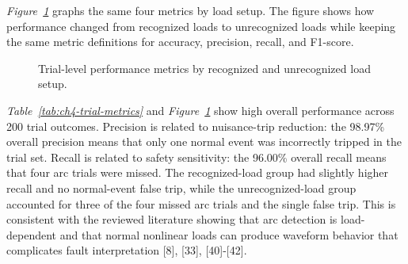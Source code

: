 \textit{Figure~\ref{fig:ch4-group-metrics}} graphs the same four metrics by
load setup. The figure shows how performance changed from recognized loads to
unrecognized loads while keeping the same metric definitions for accuracy,
precision, recall, and F1-score.

\begin{figure}[H]
  \centering
  \caption{Trial-level performance metrics by recognized and unrecognized load setup.}
  \label{fig:ch4-group-metrics}
\end{figure}

\textit{Table~\ref{tab:ch4-trial-metrics}} and
\textit{Figure~\ref{fig:ch4-group-metrics}} show high overall performance
across 200 trial outcomes. Precision is related to nuisance-trip reduction:
the 98.97\% overall precision means that only one normal event was incorrectly
tripped in the trial set. Recall is related to safety sensitivity: the 96.00\%
overall recall means that four arc trials were missed. The recognized-load
group had slightly higher recall and no normal-event false trip, while the
unrecognized-load group accounted for three of the four missed arc trials and
the single false trip. This is consistent with the reviewed literature showing
that arc detection is load-dependent and that normal nonlinear loads can
produce waveform behavior that complicates fault interpretation [8], [33],
[40]-[42].

